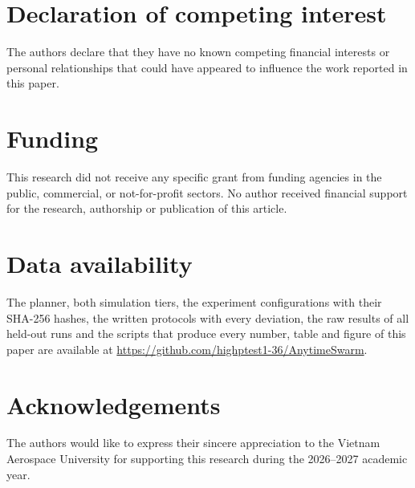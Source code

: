 
\printcredits

\section*{Declaration of competing interest}
The authors declare that they have no known competing financial interests or personal relationships that could have
appeared to influence the work reported in this paper.

\section*{Funding}
This research did not receive any specific grant from funding agencies in the public, commercial, or not-for-profit
sectors. No author received financial support for the research, authorship or publication of this article.

\section*{Data availability}
The planner, both simulation tiers, the experiment configurations with their SHA-256 hashes, the written protocols with
every deviation, the raw results of all held-out runs and the scripts that produce every number, table and figure of
this paper are available at \url{https://github.com/highptest1-36/AnytimeSwarm}.


\section*{Acknowledgements}
The authors would like to express their sincere appreciation to the Vietnam Aerospace University for supporting this
research during the 2026--2027 academic year.

